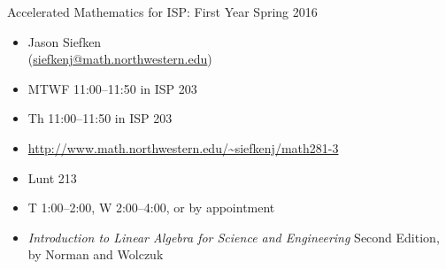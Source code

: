 \documentclass[12pt]{article}
\begin{document}
	{
		\begin{minipage}[t]{\textwidth}
			\color{deeppurple}
			\hfill Accelerated Mathematics for ISP: First Year
			\hfill Spring 2016

			\vspace{-8pt}
			\color{deeppurple}{\rule{\columnwidth}{3pt}}

			\vspace{.2cm}
		\end{minipage}
	}
	{
		\begin{minipage}[t]{.5\textwidth}
			\begin{itemize}[leftmargin=2cm, itemsep=0ex, parsep=.5ex, labelindent=-4ex, %
		  label={}]
				\item[{\sf\color{gray}{Instructor:}}] Jason Siefken\\ (\url{siefkenj@math.northwestern.edu})
				\item[{\sf\color{gray}{Class:}}] MTWF 11:00--11:50 in ISP 203
				\item[{\sf\color{gray}{Discussion Section:}}] Th 11:00--11:50 in ISP 203
				\item[{\sf\color{gray}{Webpge:}}] {\footnotesize \url{http://www.math.northwestern.edu/~siefkenj/math281-3}}
			\end{itemize}
		\end{minipage}
		\begin{minipage}[t]{.5\textwidth}
			\begin{itemize}[leftmargin=2.5cm, itemsep=0ex, parsep=.5ex, labelindent=-4ex, %
		  label={}]
				\item[{\sf\color{gray}{Office:}}] Lunt 213
				\item[{\sf\color{gray}{Office Hours:}}] T 1:00--2:00, W 2:00--4:00, or by appointment
				\item[{\sf\color{gray}{Textbook:}}] {\small {\it Introduction to Linear Algebra
					for Science and Engineering} Second Edition, by Norman and Wolczuk}
			\end{itemize}
		\end{minipage}
		\vspace{.1cm}
		\color{deeppurple}{\hrule}
	}

	\vspace{.2cm}
	
\end{document}
